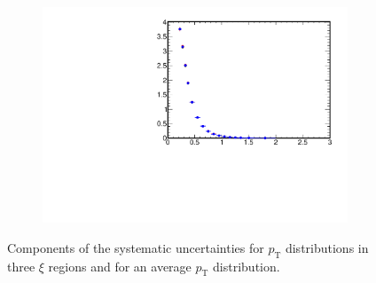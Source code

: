 \begin{figure}[h!]
\begin{subfigure}{.49\textwidth}
	\end{subfigure}
	\begin{subfigure}{.49\textwidth}
		\includegraphics[width=\textwidth,page=22]{chapters/chrgSTAR/img/syst/out_chargedmax.pdf}
	\end{subfigure}
	\caption{Components of the systematic uncertainties for $p_\textrm{T}$ distributions in three $\xi$ regions and for an average $p_\textrm{T}$ distribution. }
	\label{fig:results_star_pt_syst}
\end{figure}	

